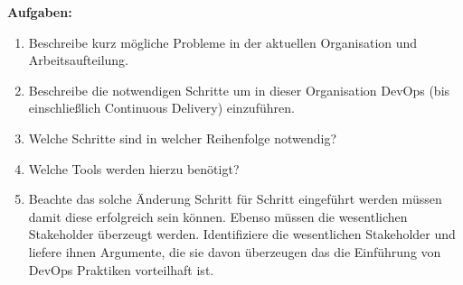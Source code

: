 \textbf{Aufgaben:}
\begin{enumerate}
    \item Beschreibe kurz mögliche Probleme in der aktuellen Organisation und Arbeitsaufteilung.\\
    


    \item Beschreibe die notwendigen Schritte um in dieser Organisation DevOps (bis einschließlich
    Continuous Delivery) einzuführen. \\


    
    \item Welche Schritte sind in welcher Reihenfolge notwendig? \\
    


    \item Welche Tools werden hierzu benötigt? \\
    
    
    \item Beachte das solche Änderung Schritt für Schritt eingeführt werden müssen damit diese
    erfolgreich sein können. Ebenso müssen die wesentlichen Stakeholder überzeugt werden.
    Identifiziere die wesentlichen Stakeholder und liefere ihnen Argumente, die sie davon
    überzeugen das die Einführung von DevOps Praktiken vorteilhaft ist. \\




\end{enumerate}